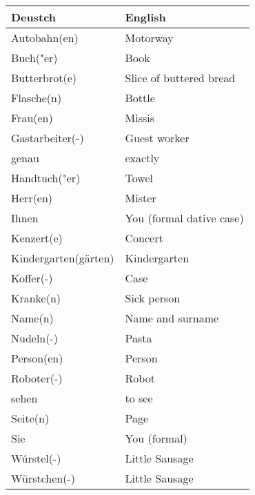 \documentclass{article}
\renewcommand{\arraystretch}{1}
\begin{document}
\begin{minipage}{0.48\textwidth}
    \centering
    \renewcommand{\arraystretch}{1.5}
    \begin{tabular}{|>{\raggedright\arraybackslash}p{3.5cm}|>{\raggedright\arraybackslash}p{3.5cm}|}
        \hline
        \rowcolor{gray!20} \textbf{Deustch} & \textbf{English} \\
        \hline
        Autobahn(en) & Motorway \\\hline
        Buch("er) & Book \\\hline
        Butterbrot(e) & Slice of buttered bread \\\hline
        Flasche(n) & Bottle \\\hline
        Frau(en) & Missis \\\hline
        Gastarbeiter(-) & Guest worker \\\hline
        genau & exactly \\\hline
        Handtuch("er) & Towel \\\hline
        Herr(en) & Mister \\\hline
        Ihnen & You (formal dative case) \\\hline
        Kenzert(e) & Concert \\\hline
        Kindergarten(gärten) & Kindergarten \\\hline
        Koffer(-) & Case \\\hline
        Kranke(n) & Sick person \\\hline
        Name(n) & Name and surname \\\hline
        Nudeln(-) & Pasta \\\hline
        Person(en) & Person \\\hline
        Roboter(-) & Robot \\\hline
        sehen & to see \\\hline
        Seite(n) & Page \\\hline
        Sie & You (formal) \\\hline
        Wúrstel(-) & Little Sausage \\\hline
        Würstchen(-) & Little Sausage \\\hline
    \end{tabular}
\end{minipage}%
\end{document}
